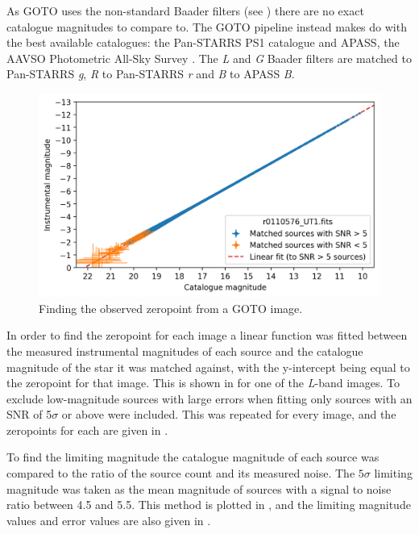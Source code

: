\begin{colsection}
\begin{colsection}
As GOTO uses the non-standard Baader filters (see ) there are no exact catalogue magnitudes to compare to. The GOTO pipeline instead makes do with the best available catalogues: the Pan-STARRS PS1 catalogue \citep{Pan-STARRS} and APASS, the AAVSO Photometric All-Sky Survey \citep{APASS}. The \textit{L} and \textit{G} Baader filters are matched to Pan-STARRS \textit{g}, \textit{R} to Pan-STARRS \textit{r} and \textit{B} to APASS \textit{B}.

\newpage

\begin{figure}[t]
    \begin{center}
        \includegraphics[width=\textwidth]{images/throughput/zeropoint_real.png}
    \end{center}
    \caption[Finding the observed zeropoint from a GOTO image]{
        Finding the observed zeropoint from a GOTO image.
    }\label{fig:zeropoint}
\end{figure}

In order to find the zeropoint for each image a linear function was fitted between the measured instrumental magnitudes of each source and the catalogue magnitude of the star it was matched against, with the y-intercept being equal to the zeropoint for that image. This is shown in  for one of the \textit{L}-band images. To exclude low-magnitude sources with large errors when fitting only sources with an SNR of 5$\sigma$ or above were included. This was repeated for every image, and the zeropoints for each are given in .

To find the limiting magnitude the catalogue magnitude of each source was compared to the ratio of the source count and its measured noise. The $5\sigma$ limiting magnitude was taken as the mean magnitude of sources with a signal to noise ratio between 4.5 and 5.5. This method is plotted in , and the limiting magnitude values and error values are also given in .


\end{colsection}
\end{colsection}

